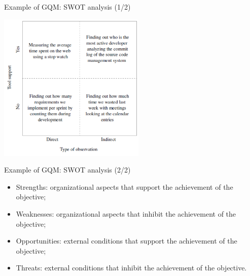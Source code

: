 \documentclass{beamer}
\begin{document}
\begin{frame}{\centerline{Example of GQM: SWOT analysis (1/2)}}


\begin{center}
\includegraphics[width=70mm]{A2022.IDSEPC.SperimentazioneDeduzione/image-01.png}
\end{center}
\end{frame}
\begin{frame}{\centerline{Example of GQM: SWOT analysis (2/2)}}

\begin{itemize}

\item  Strengths: organizational aspects that support the achievement of the objective;
\item  Weaknesses: organizational aspects that inhibit the achievement of the objective;
\item  Opportunities: external conditions that support the achievement of the objective;
\item  Threats: external conditions that inhibit the achievement of the objective.


\end{itemize}

\end{frame}

\end{document}
